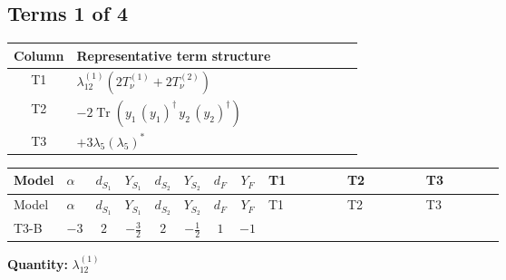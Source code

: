 \documentclass[8pt]{article}
\begin{document}
\begin{landscape}
\subsection*{Terms 1 of 4}
\begin{center}
\begin{tabular}{@{}c >{\raggedright\arraybackslash}p{0.82\linewidth}@{}}
\toprule
Column & Representative term structure \\
\midrule
T1 & \(\displaystyle {\lambda_{12}^{(1)}} (2 T_{\nu}^{(1)}+2 T_{\nu}^{(2)})\) \\
\midrule
T2 & \(\displaystyle -2 \operatorname{Tr}\!\left({y_1}\,\left({y_1}\right)^{\dagger}\,{y_2}\,\left({y_2}\right)^{\dagger}\right)\) \\
\midrule
T3 & \(\displaystyle +3 {\lambda_5} \left({\lambda_5}\right)^{*}\) \\
\midrule
\bottomrule
\end{tabular}
\end{center}
\smallskip
\tiny
\begin{longtable}{@{}llcccccc >{\raggedright\arraybackslash}p{0.21\linewidth} >{\raggedright\arraybackslash}p{0.21\linewidth} >{\raggedright\arraybackslash}p{0.21\linewidth}@{}}
\toprule
Model & $\alpha$ & $d_{S_1}$ & $Y_{S_1}$ & $d_{S_2}$ & $Y_{S_2}$ & $d_F$ & $Y_F$ & T1 & T2 & T3 \\
\midrule
\endfirsthead
\toprule
Model & $\alpha$ & $d_{S_1}$ & $Y_{S_1}$ & $d_{S_2}$ & $Y_{S_2}$ & $d_F$ & $Y_F$ & T1 & T2 & T3 \\
\midrule
\endhead
T3-B & $-3$ & $2$ & $-\frac{3}{2}$ & $2$ & $-\frac{1}{2}$ & $1$ & $-1$ & \scriptsize\adjustbox{max width=\linewidth}{$\begin{gathered} {\lambda_{12}^{(1)}} (2 T_{\nu}^{(1)}+2 T_{\nu}^{(2)})\end{gathered}$} & \scriptsize\adjustbox{max width=\linewidth}{$\begin{gathered} -2 \operatorname{Tr}\!\left({y_1}\,\left({y_1}\right)^{\dagger}\,{y_2}\,\left({y_2}\right)^{\dagger}\right)\end{gathered}$} & \scriptsize\adjustbox{max width=\linewidth}{$\begin{gathered} +3 {\lambda_5} \left({\lambda_5}\right)^{*}\end{gathered}$} \\
\midrule
\bottomrule
\end{longtable}
\clearpage
\noindent\textbf{Quantity: }$\lambda_{12}^{(1)}$\par\smallskip

\end{landscape}
\end{document}
